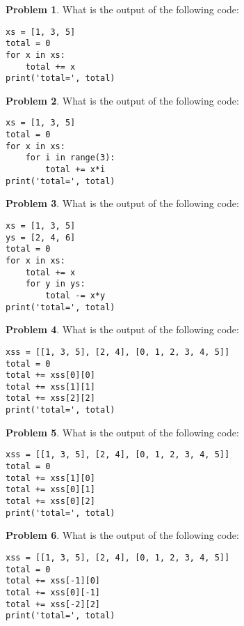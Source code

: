 \documentclass[10pt]{article}
\theoremstyle{definition}
\newtheorem{problem}{Problem}
\begin{document}
\begin{problem}
    What is the output of the following code:
\end{problem}
\begin{lstlisting}
xs = [1, 3, 5]
total = 0
for x in xs:
    total += x
print('total=', total)
\end{lstlisting}
\vspace{1.5in}

\begin{problem}
    What is the output of the following code:
\end{problem}
\begin{lstlisting}
xs = [1, 3, 5]
total = 0
for x in xs:
    for i in range(3):
        total += x*i
print('total=', total)
\end{lstlisting}
\vspace{1.5in}


\begin{problem}
    What is the output of the following code:
\end{problem}
\begin{lstlisting}
xs = [1, 3, 5]
ys = [2, 4, 6]
total = 0
for x in xs:
    total += x
    for y in ys:
        total -= x*y
print('total=', total)
\end{lstlisting}
\vspace{1.5in}


\newpage

\begin{problem}
    What is the output of the following code:
\end{problem}
\begin{lstlisting}
xss = [[1, 3, 5], [2, 4], [0, 1, 2, 3, 4, 5]]
total = 0
total += xss[0][0]
total += xss[1][1]
total += xss[2][2]
print('total=', total)
\end{lstlisting}
\vspace{1.5in}

\begin{problem}
    What is the output of the following code:
\end{problem}
\begin{lstlisting}
xss = [[1, 3, 5], [2, 4], [0, 1, 2, 3, 4, 5]]
total = 0
total += xss[1][0]
total += xss[0][1]
total += xss[0][2]
print('total=', total)
\end{lstlisting}
\vspace{1.5in}

\begin{problem}
    What is the output of the following code:
\end{problem}
\begin{lstlisting}
xss = [[1, 3, 5], [2, 4], [0, 1, 2, 3, 4, 5]]
total = 0
total += xss[-1][0]
total += xss[0][-1]
total += xss[-2][2]
print('total=', total)
\end{lstlisting}
\vspace{1.5in}
\end{document}
